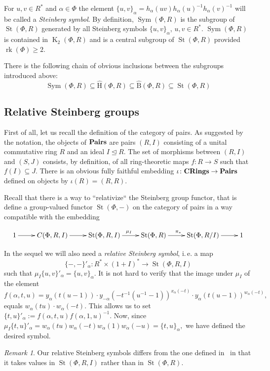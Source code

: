\documentclass[oneside, 10pt]{amsart}
\DeclareMathOperator{\St}{St}
\DeclareMathOperator{\K}{K}
\DeclareMathOperator{\rk}{rk}
\DeclareMathOperator{\Sym}{Sym}
\newcommand{\catname}[1]{{\normalfont\textbf{#1}}}
\newcommand{\StB}{\hat{\mathrm{B}}}     %
\newcommand{\StH}{\hat{\mathrm{H}}}     %
\newcommand{\ext}[1]{\mu_{#1}}           %
\numberwithin{equation}{section}
\numberwithin{lemma}{section}
\theoremstyle{definition}
\theoremstyle{remark}
\newtheorem{rem}[lemma]{Remark}
\begin{document}
For $u, v \in R^*$ and $\alpha\in\Phi$ the element $\{u,v\}_\alpha=h_\alpha(uv)h_\alpha(u)^{-1}h_\alpha(v)^{-1}$ will be
 called a {\it Steinberg symbol}. By definition, $\Sym(\Phi, R)$ is the subgroup of $\St(\Phi, R)$ generated by all Steinberg symbols $\{u, v\}_\alpha$, $u, v \in R^*$. 
$\Sym(\Phi, R)$ is contained in $\K_2(\Phi, R)$ and is a central subgroup of $\St(\Phi, R)$ provided $\rk(\Phi)\geq 2$.

There is the following chain of obvious inclusions between the subgroups introduced above:
\begin{equation}
  \Sym(\Phi, R) \subseteq \StH(\Phi, R) \subseteq \StB(\Phi, R) \subseteq \St(\Phi, R)
\end{equation}

\subsection{Relative Steinberg groups} \label{sec:relative-steinberg}
First of all, let us recall the definition of the category of pairs. 
As suggested by the notation, the objects of $\catname{Pairs}$ are pairs $(R, I)$ consisting of a unital commutative ring $R$ and an ideal $I \trianglelefteq R$.
The set of morphisms between $(R, I)$ and $(S, J)$ consists, by definition, of all ring-theoretic maps $f\colon R\to S$ such that $f(I)\subseteq J$.
There is an obvious fully faithful embedding $\iota\colon \catname{CRings} \to \catname{Pairs}$ defined on objects by $\iota(R) = (R, R)$.

Recall that there is a way to ``relativize`` the Steinberg group functor, that is define a group-valued functor $\St(\Phi, -)$ on the category of pairs
 in a way compatible with the embedding 

\begin{equation}
 \xymatrix{ 1 \ar[r] & C(\Phi, R, I) \ar[r] & \St(\Phi, R, I) \ar[r]^{\ext{I}} & \St(\Phi, R) \ar[r]^{\pi_*} & \St(\Phi, R/I) \ar[r] & 1 }
\end{equation}

In the sequel we will also need a {\it relative Steinberg symbol}, i.\,e. a map
\begin{equation*} \{-, -\}'_\alpha \colon R^* \times (1 + I)^* \to \St(\Phi, R, I) \end{equation*}
such that $ \ext{I} \{u, v\}'_\alpha = \{u, v\}_\alpha$. It is not hard to verify that the image under $\mu_I$ of the element
\begin{equation*} f(\alpha, t, u)= y_\alpha(t(u-1)) \cdot y_{-\alpha}(-t^{-1}(u^{-1}-1))^{x_\alpha(-t)} \cdot y_{\alpha}(t(u-1))^{w_\alpha(-t)}, \end{equation*}
equals $w_\alpha(tu) \cdot w_\alpha(-t)$. This allows us to set $\{t, u \}'_\alpha := f(\alpha, t, u) f(\alpha, 1, u)^{-1}.$
Now, since $\mu_I\{ t, u \}'_\alpha = w_\alpha(tu) w_\alpha(-t) w_\alpha(1) w_\alpha(-u) = \{t, u\}_\alpha,$ 
 we have defined the desired symbol.
\begin{rem}
 Our relative Steinberg symbols differs from the one defined in~\cite{Ste73} in that
  it takes values in $\St(\Phi, R, I)$ rather than in $\St(\Phi, R)$. %
\end{rem}
\end{document}
